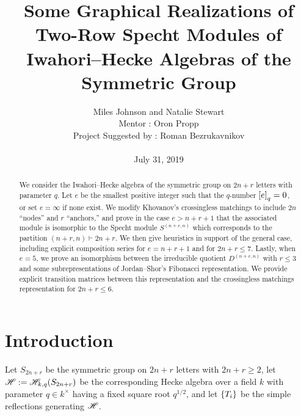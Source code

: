 \documentclass{amsart}
\begin{document}
  \title[Some Graphical Realizations of Two-Row Specht Modules of Hecke Algebras]{Some Graphical Realizations of Two-Row Specht Modules of Iwahori--Hecke Algebras of the Symmetric Group}
  \author[Miles Johnson and Natalie Stewart]{Miles Johnson and Natalie Stewart\\
    Mentor : Oron Propp\\
  Project Suggested by : Roman Bezrukavnikov\\ \; \\
  July 31, 2019
  }

   \begin{titlepage}
    \maketitle
    \begin{abstract}
      We consider the Iwahori--Hecke algebra of the symmetric group on $2n + r$ letters with parameter $q$.
      Let $e$ be the smallest positive integer such that the $q$-number $\left[ e \right]_q = 0$, or set $e = \infty$ if none exist.
      We modify Khovanov's crossingless matchings to include $2n$ ``nodes'' and $r$ ``anchors,'' and prove in the case $e > n + r + 1$ that the associated module is isomorphic to the Specht module $S^{(n+r,n)}$ which corresponds to the partition $(n + r,n) \vdash 2n + r$.
      We then give heuristics in support of the general case, including explicit composition series for $e = n + r + 1$ and for $2n + r \leq 7$. 
      Lastly, when $e = 5$, we prove an isomorphism between the irreducible quotient $D^{(n+r,n)}$ with $r \leq 3$ and some subrepresentations of Jordan--Shor's Fibonacci representation.
      We provide explicit transition matrices between this representation and the crossingless matchings representation for $2n + r \leq 6$.
    \end{abstract}

  \begingroup
  \hypersetup{linkcolor=black} %
  \tableofcontents
  \endgroup

  \end{titlepage}

\section{Introduction} 
  Let $S_{2n+r}$ be the symmetric group on $2n+r$ letters with $2n + r \geq 2$, let $\mathscr{H} := \mathscr{H}_{k,q}(S_{2n+r})$ be the corresponding Hecke algebra over a field $k$ with parameter $q \in k^\times$ having a fixed square root $q^{1/2}$, and let $\left\{ T_i \right\}$ be the simple reflections generating $\mathscr{H}$.
   
\end{document}
